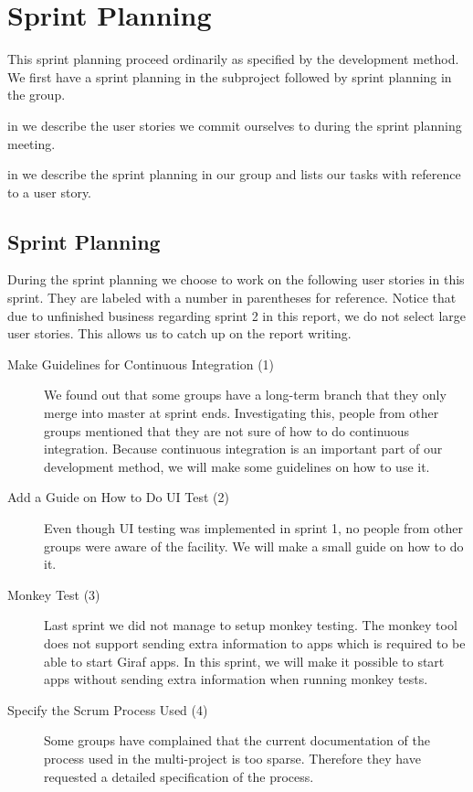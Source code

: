 \chapter{Sprint Planning}\label{chap:s3_sprintplanning}
This sprint planning proceed ordinarily as specified by the development method. We first have a sprint planning in the subproject followed by sprint planning in the group.

\begin{chapterorganization}
  \item in  we describe the user stories we commit ourselves to during the \bd sprint planning meeting.
  \item in  we describe the sprint planning in our group and lists our tasks with reference to a user story.
\end{chapterorganization}

\section{\bdtitle Sprint Planning}\label{sec:S3_bd}
During the \bd sprint planning we choose to work on the following user stories in this sprint. They are labeled with a number in parentheses for reference. Notice that due to unfinished business regarding sprint 2 in this report, we do not select large user stories. This allows us to catch up on the report writing.

\begin{description}
  \item[Make Guidelines for Continuous Integration (1)] We found out that some groups have a long-term branch that they only merge into master at sprint ends. Investigating this, people from other groups mentioned that they are not sure of how to do continuous integration. Because continuous integration is an important part of our development method, we will make some guidelines on how to use it.
  \item[Add a Guide on How to Do UI Test (2)] Even though UI testing was implemented in sprint 1, no people from other groups were aware of the facility. We will make a small guide on how to do it.
  \item[Monkey Test (3)] Last sprint we did not manage to setup monkey testing. The monkey tool does not support sending extra information to apps which is required to be able to start Giraf apps. In this sprint, we will make it possible to start apps without sending extra information when running monkey tests.
  \item[Specify the Scrum Process Used (4)] Some groups have complained that the current documentation of the process used in the multi-project is too sparse. Therefore they have requested a detailed specification of the process.
\end{description}


